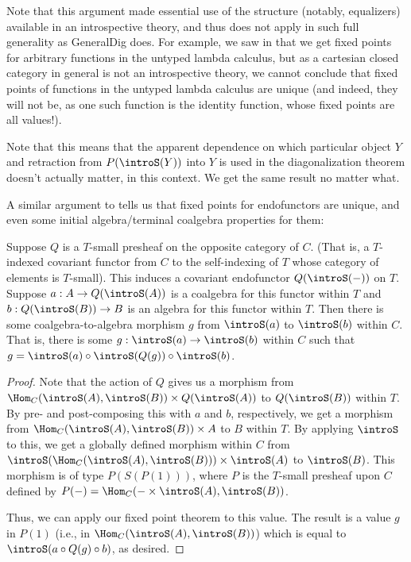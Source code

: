 \begin{observation}
Note that this argument made essential use of the structure (notably, equalizers) available in an introspective theory, and thus does not apply in such full generality as GeneralDig \TODO does. For example, we saw in  that we get fixed points for arbitrary functions in the untyped lambda calculus, but as a cartesian closed category in general is not an introspective theory, we cannot conclude that fixed points of functions in the untyped lambda calculus are unique (and indeed, they will not be, as one such function is the identity function, whose fixed points are all values!).
\end{observation}


\begin{observation}
Note that this means that the apparent dependence on which particular object $Y$ and retraction from $P(\introS(Y))$ into $Y$ is used in the diagonalization theorem doesn't actually matter, in this context. We get the same result no matter what.
\end{observation}

A similar argument to  tells us that fixed points for endofunctors are unique, and even some initial algebra/terminal coalgebra properties for them:

\begin{theorem}\label{CoalgToAlgExist}
Suppose $Q$ is a $T$-small presheaf on the opposite category of $C$. (That is, a $T$-indexed covariant functor from $C$ to the self-indexing of $T$ whose category of elements is $T$-small). This induces a covariant endofunctor $Q(\introS(-))$ on $T$. Suppose $a : A \to Q(\introS(A))$ is a coalgebra for this functor within $T$ and $b : Q(\introS(B)) \to B$ is an algebra for this functor within $T$. Then there is some coalgebra-to-algebra morphism $g$ from $\introS(a)$ to $\introS(b)$ within $C$. That is, there is some $g : \introS(a) \to \introS(b)$ within $C$ such that $g = \introS(a) \circ \introS(Q(g)) \circ \introS(b)$.
\end{theorem}
\begin{proof}
Note that the action of $Q$ gives us a morphism from $\Hom_C(\introS(A), \introS(B)) \times Q(\introS(A))$ to $Q(\introS(B))$ within $T$. By pre- and post-composing this with $a$ and $b$, respectively, we get a morphism from $\Hom_C(\introS(A), \introS(B)) \times A$ to $B$ within $T$. By applying $\introS$ to this, we get a globally defined morphism within $C$ from $\introS(\Hom_C(\introS(A), \introS(B))) \times \introS(A)$ to $\introS(B)$. This morphism is of type $P(S(P(1)))$, where $P$ is the $T$-small presheaf upon $C$ defined by $P(-) = \Hom_C(- \times \introS(A), \introS(B))$.

Thus, we can apply our fixed point theorem  to this value. The result is a value $g$ in $P(1)$ (i.e., in $\Hom_C(\introS(A), \introS(B))$) which is equal to $\introS(a \circ Q(g) \circ b)$, as desired.

\end{proof}


